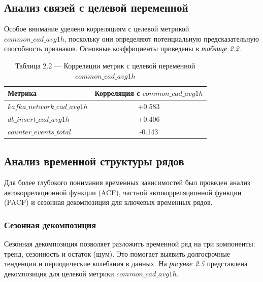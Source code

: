 \subsection{Анализ связей с целевой переменной}

\hspace*{1.25cm}Особое внимание уделено корреляциям с целевой метрикой \\
$common\_cad\_avg1h$, поскольку они определяют потенциальную предсказательную способность признаков. Основные коэффициенты приведены в \textit{таблице 2.2}.

\begin{table}[H]
	\centering
	\caption*{Таблица 2.2 --- Корреляции метрик с целевой переменной $common\_cad\_avg1h$}
	\begin{tabular}{|l|c|}
		\hline
		\textbf{Метрика} & \textbf{Корреляция с $common\_cad\_avg1h$} \\
		\hline
		$kafka\_network\_cad\_avg1h$ & +0.583 \\
		$db\_insert\_cad\_avg1h$ & +0.406 \\
		$counter\_events\_total$ & -0.143 \\
		\hline
	\end{tabular}
	\label{tab:target_correlations}
\end{table}

\subsection{Анализ временной структуры рядов}

\hspace*{1.25cm}Для более глубокого понимания временных зависимостей был проведен анализ автокорреляционной функции (ACF), частной автокорреляционной функции (PACF) и сезонная декомпозиция для ключевых временных рядов.

\subsubsection{Сезонная декомпозиция}

\hspace*{1.25cm}Сезонная декомпозиция позволяет разложить временной ряд на три компоненты: тренд, сезонность и остаток (шум). Это помогает выявить долгосрочные тенденции и периодические колебания в данных. На \textit{рисунке 2.5} представлена декомпозиция для целевой метрики $common\_cad\_avg1h$.

